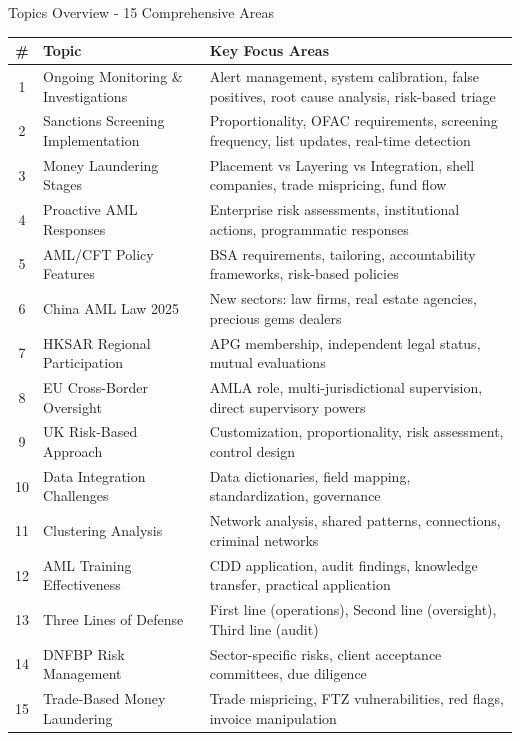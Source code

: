 \documentclass[5pt]{beamer}
\begin{document}
	\begin{frame}{Topics Overview - 15 Comprehensive Areas}
		\begin{center}
			\tiny
			\begin{tabular}{|c|p{2.0cm}|p{2.8cm}|}
				\hline
				\rowcolor{lightgray}
				\textbf{\#} & \textbf{Topic} & \textbf{Key Focus Areas} \\
				\hline
				1 & Ongoing Monitoring \& Investigations & Alert management, system calibration, false positives, root cause analysis, risk-based triage \\
				\hline
				2 & Sanctions Screening Implementation & Proportionality, OFAC requirements, screening frequency, list updates, real-time detection \\
				\hline
				3 & Money Laundering Stages & Placement vs Layering vs Integration, shell companies, trade mispricing, fund flow \\
				\hline
				4 & Proactive AML Responses & Enterprise risk assessments, institutional actions, programmatic responses \\
				\hline
				5 & AML/CFT Policy Features & BSA requirements, tailoring, accountability frameworks, risk-based policies \\
				\hline
				6 & China AML Law 2025 & New sectors: law firms, real estate agencies, precious gems dealers \\
				\hline
				7 & HKSAR Regional Participation & APG membership, independent legal status, mutual evaluations \\
				\hline
				8 & EU Cross-Border Oversight & AMLA role, multi-jurisdictional supervision, direct supervisory powers \\
				\hline
				9 & UK Risk-Based Approach & Customization, proportionality, risk assessment, control design \\
				\hline
				10 & Data Integration Challenges & Data dictionaries, field mapping, standardization, governance \\
				\hline
				11 & Clustering Analysis & Network analysis, shared patterns, connections, criminal networks \\
				\hline
				12 & AML Training Effectiveness & CDD application, audit findings, knowledge transfer, practical application \\
				\hline
				13 & Three Lines of Defense & First line (operations), Second line (oversight), Third line (audit) \\
				\hline
				14 & DNFBP Risk Management & Sector-specific risks, client acceptance committees, due diligence \\
				\hline
				15 & Trade-Based Money Laundering & Trade mispricing, FTZ vulnerabilities, red flags, invoice manipulation \\
				\hline
			\end{tabular}
		\end{center}
	\end{frame}
	
\end{document}

